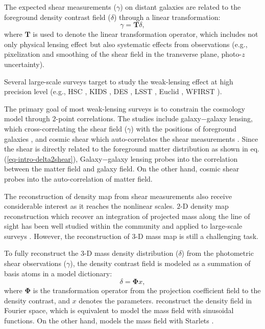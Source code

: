 \documentclass[twocolumn]{aastex62}
\begin{document}
The expected shear measurements ($\gamma$) on distant galaxies are related to
the foreground density contrast field ($\delta$) through a linear
transformation: \begin{equation} \label{eq-intro-delta2shear} \gamma=\mathbf{T}
\delta, \end{equation} where $\mathbf{T}$ is used to denote the linear
transformation operator, which includes not only physical lensing effect but
also systematic effects from observations (e.g., pixelization and smoothing of
the shear field in the transverse plane, photo-$z$ uncertainty).

Several large-scale surveys target to study the weak-lensing effect at high
precision level (e.g., HSC \citep{HSC1-data}, KIDS \citep{KIDS13}, DES
\citep{DES05}, LSST \citep{LSSTScienceBook}, Euclid \citep{Euclid2011}, WFIRST
\citep{WFIRST15}).

The primary goal of most weak-lensing surveys is to constrain the cosmology
model through $2$-point correlations. The studies include galaxy$-$galaxy
lensing, which cross-correlating the shear field ($\gamma$) with the positions
of foreground galaxies
\citep{gglens-GAMA-Han2014,gglens-BossCFHTMore2015,gglens-DES1}, and cosmic
shear which auto-correlates the shear measurements
\citep{cosmicShearRealKids450,cosmicShear-DES1,cosmicShear_HSC1_Chiaki2019,cosmicShear_HSC1_Hamana2019}.
Since the shear is directly related to the foreground matter distribution as
shown in eq.  (\ref{eq-intro-delta2shear}), Galaxy$-$galaxy lensing probes into
the correlation between the matter field and galaxy field. On the other hand,
cosmic shear probes into the auto-correlation of matter field.

The reconstruction of density map from shear measurements also receive considerable interest as it reaches the nonlinear scales.
$2$-D density map reconstruction which recover an integration of projected mass along the line of sight has been well studied
within the community \citep{massMap-KS1993,WL-massMap-Glimpse2D-Lanusse2016,sparseBaysianMassMap-Price2020}
and applied to large-scale surveys \citep{HSC1-massMaps,massMapDES-Chang2018,DES-SV-massMap-sparsity}. However, the
reconstruction of $3$-D mass map is still a challenging task.

To fully reconstruct the $3$-D mass density distribution ($\delta$) from the
photometric shear observations ($\gamma$), the density contrast field is
modeled as a summation of basis atoms in a model dictionary:
\begin{equation} \label{eq-intro-dict}
 \delta= \mathbf{\Phi} x,
\end{equation}
where $\mathbf{\Phi}$ is the transformation operator from the projection
coefficient field to the density contrast, and $x$ denotes the parameters.
\citet{LSS-massMap-Wiener-Simon2009} reconstruct the density field in Fourier
space, which is equivalent to model the mass field with sinusoidal functions.
On the other hand, \citet{LSS-massMap-Glimpse3D-Leonard2014} models the mass
field with Starlets \citep{Starlet-Starck2015}.
\end{document}

